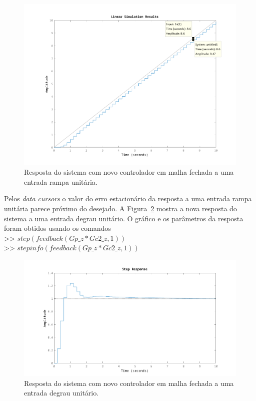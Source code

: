 \documentclass{article}
\begin{document}
{        \begin{figure}[H]
           \centering
                \includegraphics[width=.8\linewidth]{images/q2_ramp_response_new.png}
                \caption{Resposta do sistema com novo controlador em malha
                    fechada a uma entrada rampa unitária.}
                \label{fig:q2_ramp_response_new}
        \end{figure}

        {Pelos \textit{data cursors} o valor do erro estacionário da resposta
            a uma entrada rampa unitária parece próximo do desejado. A
            Figura~\ref{fig:q2_step_response_new} mostra a nova resposta do sistema
            a uma entrada degrau unitário. O gráfico e os parâmetros da resposta
            foram obtidos usando os comandos\\
        >> $ step(feedback(Gp\_z * Gc2\_z, 1)) $\\
        >> $ stepinfo(feedback(Gp\_z * Gc2\_z, 1)) $ }\\

        \begin{figure}[H]
           \centering
                \includegraphics[width=1\linewidth]{images/q2_step_response_new.png}
                \caption{Resposta do sistema com novo controlador em malha
                    fechada a uma entrada degrau unitário.}
                \label{fig:q2_step_response_new}
        \end{figure}

}
\end{document}

